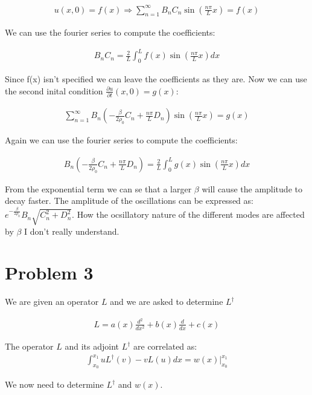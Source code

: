 \documentclass[a4paper]{article}
\begin{document}
\begin{align*}
    u(x,0) = f(x) \Rightarrow \sum_{n=1}^{\infty} B_n C_n \sin\left(\frac{n\pi}{L}x\right) = f(x)
\end{align*}

We can use the fourier series to compute the coefficients:

\begin{align*}
    B_nC_n = \frac{2}{L} \int_0^L f(x) \sin\left(\frac{n\pi}{L}x\right) dx
\end{align*}

Since f(x) isn't specified we can leave the coefficients as they are. Now we can use the second inital condition $\frac{\partial u}{\partial t}(x,0) = g(x)$:

\begin{align*}
    \sum_{n=1}^{\infty} B_n(-\frac{\beta}{2 \rho_0}C_n + \frac{n\pi}{L}D_n)\sin\left(\frac{n\pi}{L}x\right) = g(x)
\end{align*}

Again we can use the fourier series to compute the coefficients:

\begin{align*}
    B_n(-\frac{\beta}{2 \rho_0}C_n + \frac{n\pi}{L}D_n) = \frac{2}{L} \int_0^L g(x) \sin\left(\frac{n\pi}{L}x\right) dx
\end{align*}

From the exponential term we can se that a larger $\beta$ will cause the amplitude to decay faster. The amplitude of the oscillations can be expressed as: $e^{-\frac{\beta}{2 \rho_0}}B_n\sqrt{C_n^2+D_n^2}$. How the ocsillatory nature of the different modes are affected by $\beta$ I don't really understand. 

\section*{Problem 3}

We are given an operator $L$ and we are asked to determine $L^\dagger$

\begin{align*}
    L = a(x) \frac{d^2}{dx^2} + b(x) \frac{d}{dx} + c(x)
\end{align*}

The operator $L$ and its adjoint $L^\dagger$ are correlated as:
\begin{align*}
    \int_{x_0}^{x_1} u L^\dagger(v) - v L(u) dx = w(x) \bigg\rvert_{x_0}^{x_1}
\end{align*}

We now need to determine $L^\dagger$ and $w(x)$.
\end{document}
